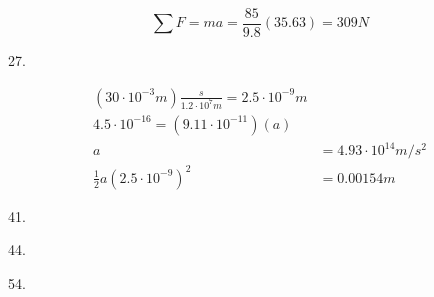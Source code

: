 \documentclass{scrreprt} %
\begin{document}
$$
\sum F = ma = \frac{85}{9.8}(35.63) = 309N
$$

27.

\begin{align*}
	(30\cdot 10^{-3} m)\frac{s}{1.2\cdot 10^7 m} = 2.5 \cdot 10^{-9} m \\
	4.5\cdot 10^{-16} = (9.11\cdot 10^{-11})(a) \\
	a &= 4.93\cdot 10^{14} m/s^2 \\
	\frac{1}{2} a (2.5\cdot 10^{-9})^2 &= \boxed{0.00154 m}
\end{align*}

41.

44.

54.
\end{document}
